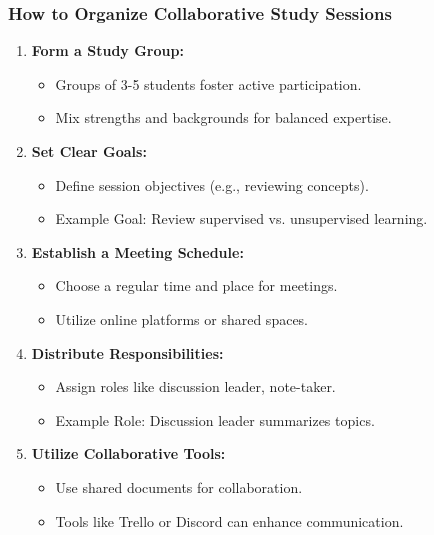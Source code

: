\documentclass[aspectratio=169]{beamer}
\begin{document}
\begin{frame}[fragile]
    \frametitle{How to Organize Collaborative Study Sessions}
    \begin{enumerate}
        \item \textbf{Form a Study Group:}
            \begin{itemize}
                \item Groups of 3-5 students foster active participation.
                \item Mix strengths and backgrounds for balanced expertise.
            \end{itemize}
        \item \textbf{Set Clear Goals:}
            \begin{itemize}
                \item Define session objectives (e.g., reviewing concepts).
                \item Example Goal: Review supervised vs. unsupervised learning.
            \end{itemize}
        \item \textbf{Establish a Meeting Schedule:}
            \begin{itemize}
                \item Choose a regular time and place for meetings.
                \item Utilize online platforms or shared spaces.
            \end{itemize}
        \item \textbf{Distribute Responsibilities:}
            \begin{itemize}
                \item Assign roles like discussion leader, note-taker.
                \item Example Role: Discussion leader summarizes topics.
            \end{itemize}
        \item \textbf{Utilize Collaborative Tools:}
            \begin{itemize}
                \item Use shared documents for collaboration.
                \item Tools like Trello or Discord can enhance communication.
            \end{itemize}
    \end{enumerate}
\end{frame}
\end{document}
